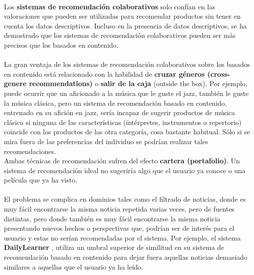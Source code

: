 \documentclass[12pt,letterpaper,oneside] {memoir}
\begin{document}
\paragraph{}
Los \textbf{sistemas de recomendación colaborativos} solo confían en las valoraciones que pueden ser utilizadas para recomendar productos sin tener en cuenta los datos descriptivos. Incluso en la presencia de datos descriptivos, se ha demostrado que los sistemas de recomendación colaborativos pueden ser más precisos que los basados en contenido.  %
\paragraph{}
La gran ventaja de los sistemas de recomendación colaborativos sobre los basados en contenido está relacionado con la habilidad de \textbf{cruzar géneros (cross-genere recommendations)} o \textbf{salir de la caja} (outside the box). Por ejemplo, puede ocurrir que un aficionado a la música que le guste el jazz, también le guste la música clásica, pero un sistema de recomendación basado en contenido, entrenado en su afición en jazz, sería incapaz de sugerir productos de música clásica si ninguna de las características (intérpretes, instrumentos o repertorio) coincide con los productos de las otra categoría, cosa bastante habitual. Sólo si se mira fuera de las preferencias del individuo se podrían realizar tales recomendaciones.\\
Ambas técnicas de recomendación sufren del efecto \textbf{cartera (portafolio)}. Un sistema de recomendación ideal no sugeriría algo que el usuario ya conoce o una película que ya ha visto.
\paragraph{}
El problema se complica en dominios tales como el filtrado de noticias, donde es muy fácil encontrarse la misma noticia repetida varias veces, pero de fuentes distintas, pero donde también es muy fácil encontrarse la misma noticia presentando nuevos hechos o perspectivas que, podrían ser de interés para el usuario y estas no serían recomendadas por el sistema. Por ejemplo, el sistema \textbf{DailyLearner} \citep{Billsus2000}, utiliza un umbral superior de similitud en su sistema de recomendación basado en contenido para dejar fuera aquellas noticias demasiado similares a aquellas que el usuario ya ha leído.
\end{document}
